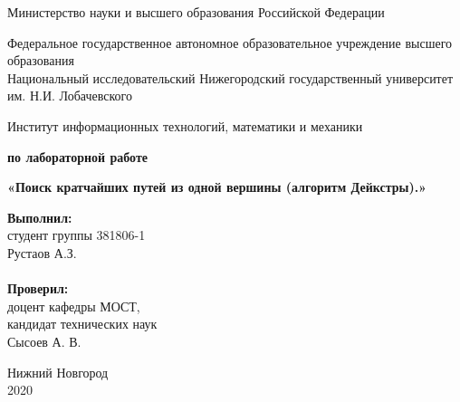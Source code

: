\documentclass{report}
\begin{document}
\begin{titlepage}

\begin{center}
Министерство науки и высшего образования Российской Федерации
\end{center}

\begin{center}
Федеральное государственное автономное образовательное учреждение высшего образования \\
Национальный исследовательский Нижегородский государственный университет им. Н.И. Лобачевского
\end{center}

\begin{center}
Институт информационных технологий, математики и механики
\end{center}

\vspace{4em}

\begin{center}
\textbf{ по лабораторной работе} \\
\end{center}
\begin{center}
\textbf{\Large«Поиск кратчайших путей из одной вершины (алгоритм Дейкстры).»} \\
\end{center}

\vspace{4em}

\newbox{\lbox}
\newlength{\maxl}
\setlength{\maxl}{\wd\lbox}
\hfill\parbox{7cm}{
\hspace*{5cm}\hspace*{-5cm}\textbf{Выполнил:} \\ студент группы 381806-1 \\ Рустаов А.З.\\
\\
\hspace*{5cm}\hspace*{-5cm}\textbf{Проверил:}\\ доцент кафедры МОСТ, \\ кандидат технических наук \\ Сысоев А. В.\\
}
\vspace{\fill}

\begin{center} Нижний Новгород \\ 2020 \end{center}

\end{titlepage}
\end{document}
